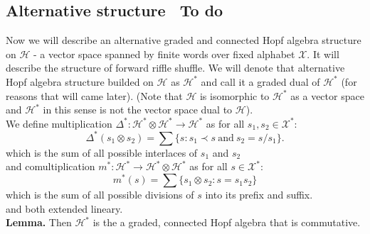 \documentclass[a4paper, 12pt]{report}
\newcommand{\smalltodo}[1]{\textbf{\ To do}}
\begin{document}
\subsection{Alternative structure \smalltodo{a}}
\indent Now we will describe an alternative graded and connected Hopf algebra structure on $\mathcal{H}$ - a
vector space spanned
by finite words over fixed alphabet $\mathcal{X}$. It will describe the structure of forward riffle shuffle.
We will denote that alternative Hopf algebra structure
builded on $\mathcal{H}$ as $\mathcal{H}^*$ and call it a graded dual of $\mathcal{H}^*$ (for reasons that
will came later).
(Note that $\mathcal{H}$ is isomorphic to $\mathcal{H}^*$ as a vector space and $\mathcal{H}^*$ in this
sense is not the vector space dual to $\mathcal{H}$). \\
We define multiplication $\Delta^* : \mathcal{H}^* \otimes \mathcal{H}^* \to \mathcal{H}^*$ as
for all $s_1, s_2 \in \mathcal{X}^*$:
\begin{equation*}
\Delta^*(s_1 \otimes s_2) = \sum\{s : s_1 \prec s \mathrm{\ and\ } s_2 = s/s_1\}.
\end{equation*}
which is the sum of all possible interlaces of $s_1$ and $s_2$ \\
and comultiplication $m^* : \mathcal{H}^* \to \mathcal{H}^* \otimes \mathcal{H}^*$ as for all $s \in
\mathcal{X}^*$:
\begin{equation*}
m^*(s) = \sum\{ s_1 \otimes s_2 : s=s_1s_2 \}
\end{equation*}
which is the sum of all possible divisions of $s$ into its prefix and suffix. \\
and both extended lineary. \\
\textbf{Lemma. } Then $\mathcal{H}^*$ is the a graded, connected Hopf algebra that is commutative.
\end{document}
